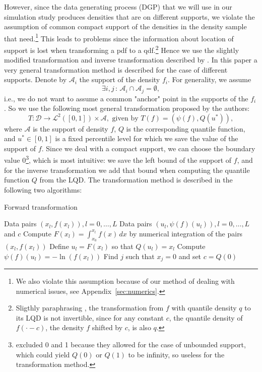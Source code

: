 However, since the data generating process (DGP) that we will use in our simulation study
produces densities that are on different supports, we violate the assumption of common
compact support of the densities in the density sample that \textcite{PetersenMüller2016}
need.\footnote{We also violate this assumption because of our method of dealing with
numerical issues, see Appendix~\ref{sec:numerics}.} This leads to problems since the information
about location of support is lost when transforming a pdf to a qdf.\footnote{Sligthly
paraphrasing \textcite{KokoszkaEtAl2019}, the transformation from $f$ with quantile
density $q$ to its LQD is not invertible, since for any constant $c$, the quantile density of
$f(\cdot - c)$, the density $f$ shifted by $c$, is also $q$.}
Hence we use the slightly modified transformation and inverse transformation described
by \textcite{KokoszkaEtAl2019}. In this paper a very general transformation method is
described for the case of different supports. Denote by $\mathcal{A}_i$ the support of
the density $f_i$. For generality, we assume
\begin{equation*}
    \exists i, j \, : \, \mathcal{A}_i \cap \mathcal{A}_j = \emptyset,
\end{equation*}
i.e., we do not want to assume a common "anchor" point in the supports of the $f_i$. So
we use the following most general transformation proposed by the authors:
\begin{equation}
    T : \mathcal{D} \to \mathcal{L}^2([0,1]) \times \mathcal{A}, \text{ given by } T(f) = (\psi(f), Q(u^*)),
\end{equation}
where $\mathcal{A}$ is the support of density $f$, $Q$ is the corresponding quantile function,
and $u^* \in [0,1]$ is a fixed percentile level for which we save the value of the support
of $f$. Since we deal with a compact support, we can choose the boundary value
0\footnote{\textcite{KokoszkaEtAl2019} excluded 0 and 1 because they allowed for the case
of unbounded support, which could yield $Q(0)$ or $Q(1)$ to be infinity, so useless for
the transformation method.}, which is most intuitive: we save the left bound of the
support of $f$, and for the inverse transformation we add that bound when computing
the quantile function $Q$ from the LQD. The transformation method is described in the
following two algorithms:

\begin{algorithm}
    \caption{Forward transformation}
    \label{alg:forward}
    \begin{algorithmic}[1]
    \Require Data pairs \( (x_l, f(x_l)), l = 0, \ldots, L \)
    \Ensure Data pairs \( (u_l, \psi(f)(u_l)), l = 0, \ldots, L \) and \( c \)
        \State Compute \( F(x_l) = \int_{x_0}^{x_l} f(x) \, dx \) by numerical integration of the pairs \( (x_l, f(x_l)) \)
        \State Define \( u_l = F(x_l) \) so that \( Q(u_l) = x_l \)
        \State Compute \( \psi(f)(u_l) = -\ln(f(x_l)) \)
        \State Find \( j \) such that \( x_j = 0 \) and set \( c = Q(0) \)
    \EndFor
    \end{algorithmic}
\end{algorithm}

